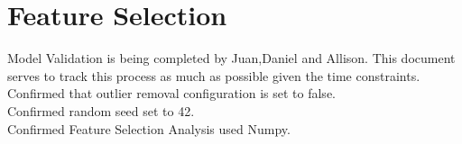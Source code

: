 \documentclass[12pt, letterpaper]{article}
\begin{document}
\pagestyle{cb} %

\newpage

\tableofcontents

\newpage

\section{Feature Selection} 
Model Validation is being completed by Juan,Daniel and Allison. This document serves to track this process as much as possible given the time constraints.\\

Confirmed that outlier removal configuration is set to false.\\
Confirmed random seed set to 42.\\
Confirmed Feature Selection Analysis used Numpy.\\
\end{document}

